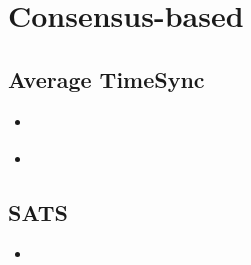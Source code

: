 \documentclass[a4paper,12pt]{article}
\begin{document}
\section{Consensus-based}

\subsection{Average TimeSync}

\begin{itemize}
\item \cite{SchenatoGamba07}
\item \cite{LucaFiorentin11}
\end{itemize}

\subsection{SATS}

\begin{itemize}
  \item \cite{HeChengShiChen13}
\end{itemize}

\printbibliography
\end{document}
